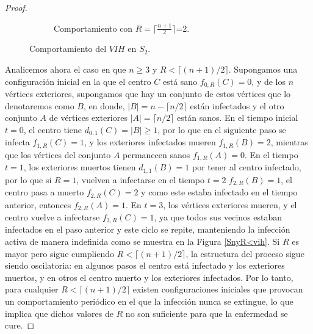 \documentclass[12pt,titlepage,twoside,openright]{book}
\begin{document}
\begin{proof}
\begin{figure}[h]
\begin{subfigure}[b]{0.6\linewidth}
    \caption{Comportamiento con $R=\lceil \frac{n+1}{2} \rceil$=2.}
    \label{S2yR=2}
    \end{subfigure}
    \caption{Comportamiento del $VIH$ en $S_2$.}
    \label{S2}
    \end{figure}
    Analicemos ahora el caso en que $n\ge 3$ y $R<\lceil (n+1)/2\rceil$. Supongamos una configuraci\'on inicial en la que el centro $C$ est\'a sano $f_{0,R}(C)=0$, y de los $n$ v\'ertices exteriores, supongamos que hay un conjunto de estos v\'ertices que lo denotaremos como $B$, en donde, $|B|=n-\lceil n/2\rceil$ est\'an infectados y el otro conjunto $A$ de v\'ertices exteriores $|A|=\lceil n/2\rceil$ est\'an sanos. En el tiempo inicial $t=0$, el centro tiene $d_{0,1}(C)=|B|\ge 1$, por lo que en el siguiente paso se infecta $f_{1,R}(C)=1$, y los exteriores infectados mueren $f_{1,R}(B)=2$, mientras que los v\'ertices del conjunto $A$ permanecen sanos $f_{1,R}(A)=0$. En el tiempo $t=1$, los exteriores muertos tienen $d_{1,1}(B)=1$ por tener al centro infectado, por lo que si $R=1$, vuelven a infectarse en el tiempo $t=2$ $f_{2,R}(B)=1$, el centro pasa a muerto $f_{2,R}(C)=2$ y como este estaba infectado en el tiempo anterior, entonces $f_{2,R}(A)=1$. En $t=3$, los v\'ertices exteriores mueren, y el centro vuelve a infectarse $f_{3,R}(C)=1$, ya que todos sus vecinos estaban infectados en el paso anterior y este ciclo se repite, manteniendo la infecci\'on activa de manera indefinida como se muestra en la Figura \ref{SnyR<vih}. Si $R$ es mayor pero sigue cumpliendo $R<\lceil (n+1)/2\rceil$, la estructura del proceso sigue siendo oscilatoria: en algunos pasos el centro est\'a infectado y los exteriores muertos, y en otros el centro muerto y los exteriores infectados. Por lo tanto, para cualquier $R<\lceil (n+1)/2\rceil$ existen configuraciones iniciales que provocan un comportamiento peri\'odico en el que la infecci\'on nunca se extingue, lo que implica que dichos valores de $R$ no son suficiente para que la enfermedad se cure.


\end{proof}
\end{document}
